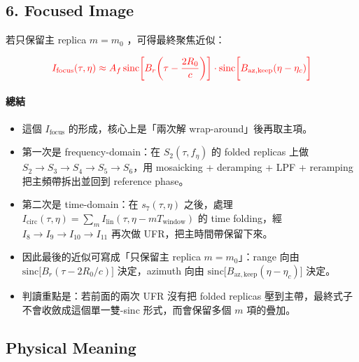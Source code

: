 \documentclass[11pt]{article}
\providecommand{\tightlist}{%
  \setlength{\itemsep}{0pt}\setlength{\parskip}{0pt}}
\begin{document}
\hypertarget{focused-image}{%
\subsection{6. Focused Image}\label{focused-image}}

若只保留主 replica \(m=m_0\) ，可得最終聚焦近似：

\begin{equation}
\begin{aligned}
{\color{red}{I_{\mathrm{focus}}(\tau,\eta) \approx A_f\,
\mathrm{sinc}\biggl[ B_r\biggl( \tau-\frac{2R_0}{c} \biggr) \biggr]\cdot
\mathrm{sinc}\biggl[ B_{\mathrm{az,keep}}(\eta-\eta_c) \biggr]}}
\end{aligned}
\end{equation}

\hypertarget{ux7e3dux7d50}{%
\paragraph{總結}\label{ux7e3dux7d50}}

\begin{itemize}
\tightlist
\item
  這個 \(I_{\mathrm{focus}}\) 的形成，核心上是「兩次解
  wrap-around」後再取主項。
\item
  第一次是 frequency-domain：在 \(S_2(\tau,f_\eta)\) 的 folded replicas
  上做
  \(S_2 \rightarrow S_3 \rightarrow S_4 \rightarrow S_5 \rightarrow S_6\)，用
  mosaicking + deramping + LPF + reramping 把主頻帶拆出並回到 reference
  phase。
\item
  第二次是 time-domain：在 \(s_7(\tau,\eta)\) 之後，處理
  \(I_{\mathrm{circ}}(\tau,\eta)=\sum_m I_{\mathrm{lin}}(\tau,\eta-mT_{\mathrm{window}})\)
  的 time folding，經
  \(I_8 \rightarrow I_9 \rightarrow I_{10} \rightarrow I_{11}\) 再次做
  UFR，把主時間帶保留下來。
\item
  因此最後的近似可寫成「只保留主 replica \(m=m_0\)」：range 向由
  \(\mathrm{sinc}\bigl[ B_r(\tau-2R_0/c) \bigr]\) 決定，azimuth 向由
  \(\mathrm{sinc}\bigl[ B_{\mathrm{az,keep}}(\eta-\eta_c) \bigr]\)
  決定。
\item
  判讀重點是：若前面的兩次 UFR 沒有把 folded replicas
  壓到主帶，最終式子不會收斂成這個單一雙-sinc 形式，而會保留多個 \(m\)
  項的疊加。
\end{itemize}

\hypertarget{physical-meaning}{%
\subsection{Physical Meaning}\label{physical-meaning}}
\end{document}
